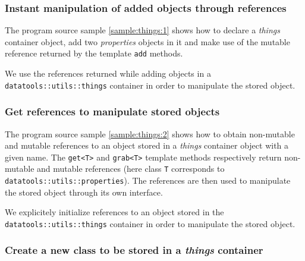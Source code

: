 \subsubsection{Instant manipulation of added objects through references}

\pn The  program source sample  \ref{sample:things:1} shows
how to declare a \emph{things} container object, add two \emph{properties}
objects in it and make use of the mutable reference returned by the template 
\texttt{add} methods.

\begin{sample}[h]
\caption{We use the references returned while adding objects in  a
  \texttt{datatools::utils::things} container in order to manipulate
  the stored object.  
}
\label{sample:things:1}
\end{sample}


\subsubsection{Get references to manipulate stored objects}

\pn  The  program source  sample  \ref{sample:things:2}  shows how  to
obtain non-mutable  and mutable  references to an  object stored  in a
\emph{things} container object with a given name.  The \texttt{get<T>}
and \texttt{grab<T>} template  methods respectively return non-mutable
and   mutable  references  (here   class  \texttt{T}   corresponds  to
\texttt{datatools::utils::properties}).  The  references are then used
to manipulate the stored object through its own interface.

\begin{sample}[h]
\caption{We explicitely  initialize references to an  object stored in
  the   \texttt{datatools::utils::things}   container   in  order   to
  manipulate the stored object.  }
\label{sample:things:2}
\end{sample}

\subsubsection{Create a new class to be stored in a \emph{things} container}

